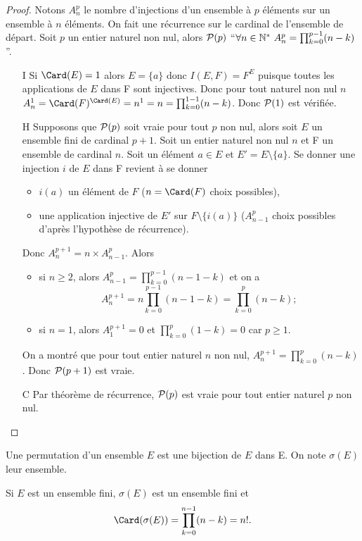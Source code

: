 \begin{proof}
  Notons $A_n^p$ le nombre d'injections d'un ensemble à $p$ éléments sur un ensemble à $n$ éléments. On fait une récurrence sur le cardinal de l'ensemble de départ. Soit $p$ un entier naturel non nul, alors $\P(p)$ ``$\forall n \in \N^* \ A_n^p=\prod_{k=0}^{p-1}(n-k)$''. 
  \begin{itemize}
  \item[I] Si $\Card(E)=1$ alors $E=\{a\}$ donc $I(E,F)=F^E$ puisque toutes les applications de $E$ dans F sont injectives. Donc pour tout naturel non nul $n$ $A_n^1=\Card(F)^{\Card(E)}=n^1=n=\prod_{k=0}^{1-1}(n-k)$. Donc $\P(1)$ est vérifiée.
  \item[H] Supposons que $\P(p)$ soit vraie pour tout $p$ non nul, alors soit $E$ un ensemble fini de cardinal $p+1$. Soit un entier naturel non nul $n$ et F un ensemble de cardinal $n$. Soit un élément $a\in E$ et $E'=E\setminus\{a\}$. Se donner une injection $i$ de $E$ dans F revient à se donner
    \begin{itemize}
    \item $i(a)$ un élément de $F$ ($n=\Card(F)$ choix possibles),
    \item une application injective de $E'$ sur $F\setminus\{i(a)\}$ ($A_{n-1}^p$ choix possibles d'après l'hypothèse de récurrence).
    \end{itemize}
    Donc $A_{n}^{p+1}=n \times A_{n-1}^p$. Alors 
    \begin{itemize}
    \item si $n\geq 2$, alors  $A_{n-1}^p=\prod_{k=0}^{p-1}(n-1-k)$ et on a
      \begin{equation}
        A_{n}^{p+1}=n\prod_{k=0}^{p-1}(n-1-k)=\prod_{k=0}^{p}(n-k);
      \end{equation}
    \item si $n=1$, alors $A_{1}^{p+1}=0$ et $\prod_{k=0}^{p}(1-k)=0$ car $p\geq 1$.
    \end{itemize}
    On a montré que pour tout entier naturel $n$ non nul, $A_{n}^{p+1}=\prod_{k=0}^{p}(n-k)$. Donc $\P(p+1)$ est vraie.
  \item[C] Par théorème de récurrence, $\P(p)$ est vraie pour tout entier naturel $p$ non nul.
  \end{itemize}
\end{proof}
\begin{defdef}
  Une permutation d'un ensemble $E$ est une bijection de $E$ dans E. On note $\sigma(E)$ leur ensemble.
\end{defdef}
\begin{prop}
  Si $E$ est un ensemble fini, $\sigma(E)$ est un ensemble fini et
  \begin{equation}
    \Card(\sigma(E))=\prod_{k=0}^{n-1}(n-k)=n!.
  \end{equation}
\end{prop}
